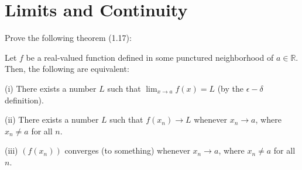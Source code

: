 \section{Limits and Continuity}

\begin{exercise}{40}
    Prove the following theorem (1.17):

    Let $f$ be a real-valued function defined in some punctured neighborhood of $a \in \mathbb{R}$. Then, the following are equivalent:

    (i) There exists a number $L$ such that $\lim_{x \rightarrow a} f(x) = L$ (by the $\epsilon - \delta$ definition).

    (ii) There exists a number $L$ such that $f(x_n) \rightarrow L$ whenever $x_n 
    \rightarrow a$, where $x_n \neq a$ for all $n$.

    (iii) $(f(x_n))$ converges (to something) whenever $x_n \rightarrow a$, where $x_n \neq a$ for all $n$.
\end{exercise}

